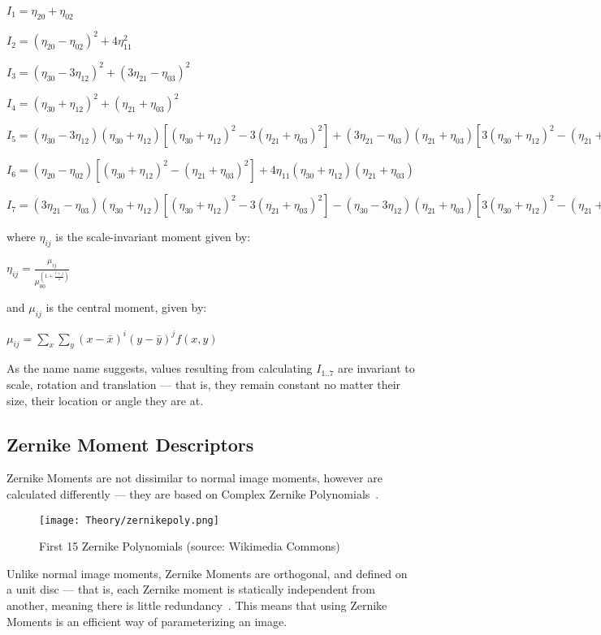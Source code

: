 $I_1 = \eta_{20} + \eta_{02}$

$I_2 = (\eta_{20} - \eta_{02})^2 + 4\eta_{11}^2$

$I_3 = (\eta_{30} - 3\eta_{12})^2 + (3\eta_{21} - \eta_{03})^2$

$I_4 = (\eta_{30} + \eta_{12})^2 + (\eta_{21} + \eta_{03})^2$

$I_5 = (\eta_{30} - 3\eta_{12}) (\eta_{30} + \eta_{12})[ (\eta_{30} + \eta_{12})^2 - 3 (\eta_{21} + \eta_{03})^2] + (3 \eta_{21} - \eta_{03}) (\eta_{21} + \eta_{03})[ 3(\eta_{30} + \eta_{12})^2 -  (\eta_{21} + \eta_{03})^2]$

$I_6 =  (\eta_{20} - \eta_{02})[(\eta_{30} + \eta_{12})^2 - (\eta_{21} + \eta_{03})^2] + 4\eta_{11}(\eta_{30} + \eta_{12})(\eta_{21} + \eta_{03})$

$I_7 = (3 \eta_{21} - \eta_{03})(\eta_{30} + \eta_{12})[(\eta_{30} + \eta_{12})^2 - 3(\eta_{21} + \eta_{03})^2] - (\eta_{30} - 3\eta_{12})(\eta_{21} + \eta_{03})[3(\eta_{30} + \eta_{12})^2 - (\eta_{21} + \eta_{03})^2]$

where $\eta_{ij}$ is the scale-invariant moment given by:

$\eta_{ij} = \frac{\mu_{ij}} {\mu_{00}^{\left(1 + \frac{i+j}{2}\right)}}\,\!$

and $\mu_{ij}$ is the central moment, given by:

$\mu_{ij} = \sum_{x} \sum_{y} (x - \bar{x})^i(y - \bar{y})^j f(x,y)$

As the name name suggests, values resulting from calculating $I_{1..7}$ are invariant to scale, rotation and translation --- that is, they remain constant no matter their size, their location or angle they are at. 

\subsection{Zernike Moment Descriptors}
\label{sec:zernike}
Zernike Moments are not dissimilar to normal image moments, however are calculated differently --- they are based on Complex Zernike Polynomials~\cite{liao1997image}.

\begin{figure}[H]
    \centering
    \texttt{[image: Theory/zernikepoly.png]}
    \caption{First 15 Zernike Polynomials (source: Wikimedia Commons)}
\end{figure}

Unlike normal image moments, Zernike Moments are orthogonal, and defined on a unit disc --- that is, each Zernike moment is statically independent from another, meaning there is little redundancy~\cite{amayeh2005accurate}. This means that using Zernike Moments is an efficient way of parameterizing an image.
